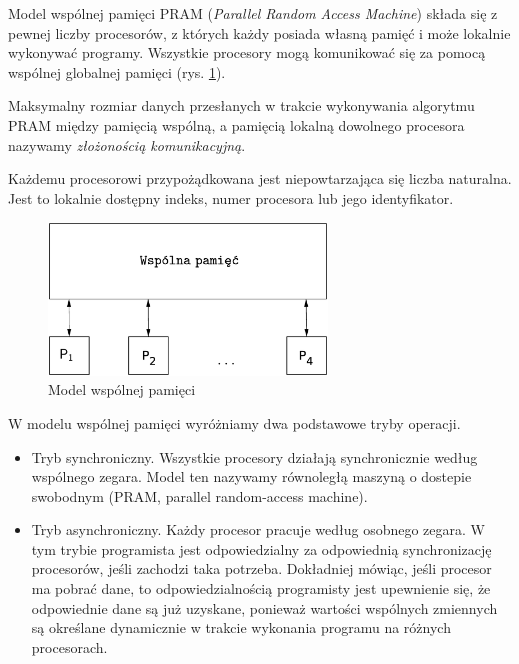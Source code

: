 Model wspólnej pamięci PRAM (\emph{Parallel Random Access Machine}) składa się z pewnej liczby procesorów, z których każdy posiada własną pamięć i może lokalnie wykonywać programy. Wszystkie procesory mogą komunikować się za pomocą wspólnej globalnej pamięci (rys. \ref{fig:model_shared}).

\begin{definicja}\label{def:communication_complexity}
Maksymalny rozmiar danych przesłanych w trakcie wykonywania algorytmu PRAM między pamięcią wspólną, a pamięcią lokalną dowolnego procesora nazywamy \emph{złożonością komunikacyjną}.
\end{definicja}

Każdemu procesorowi przypożądkowana jest niepowtarzająca się liczba naturalna. Jest to lokalnie dostępny indeks, numer procesora lub jego identyfikator.

\begin{figure}[h]
\centering
\includegraphics[width=20em]{images/Rys4.eps}
\caption{Model wspólnej pamięci}
\label{fig:model_shared}
\end{figure}


W modelu wspólnej pamięci wyróżniamy dwa podstawowe tryby operacji.
\begin{itemize}
\item Tryb synchroniczny. Wszystkie procesory działają synchronicznie według wspólnego zegara. Model ten nazywamy równoległą maszyną o dostepie swobodnym (PRAM, parallel random-access machine).


\item Tryb asynchroniczny. Każdy procesor pracuje według osobnego zegara. W tym trybie programista jest odpowiedzialny za odpowiednią synchronizację procesorów, jeśli zachodzi taka potrzeba. Dokładniej mówiąc, jeśli procesor ma pobrać dane, to odpowiedzialnością programisty jest upewnienie się, że odpowiednie dane są już uzyskane, ponieważ wartości wspólnych zmiennych są określane dynamicznie w trakcie wykonania programu na różnych procesorach.
\end{itemize}

